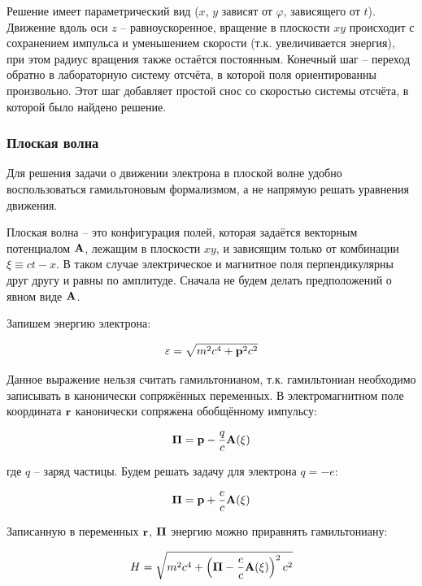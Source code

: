 \documentclass[10pt, a4paper]{article}
\begin{document}
Решение имеет параметрический вид ($x$, $y$ зависят от $\varphi$, зависящего от $t$). Движение вдоль оси $z$ -- равноускоренное, вращение в плоскости $xy$ происходит с сохранением импульса и уменьшением скорости (т.к. увеличивается энергия), при этом радиус вращения также остаётся постоянным. Конечный шаг -- переход обратно в лабораторную систему отсчёта, в которой поля ориентированны произвольно. Этот шаг добавляет простой снос со скоростью системы отсчёта, в которой было найдено решение.

\subsubsection{Плоская волна}

Для решения задачи о движении электрона в плоской волне удобно воспользоваться гамильтоновым формализмом, а не напрямую решать уравнения движения.

Плоская волна -- это конфигурация полей, которая задаётся векторным потенциалом $\vb{A}$, лежащим в плоскости $xy$, и зависящим только от комбинации $\xi\equiv ct - x$. В таком случае электрическое и магнитное поля перпендикулярны друг другу и равны по амплитуде. Сначала не будем делать предположений о явном виде $\vb{A}$.

Запишем энергию электрона:

\begin{equation*}
	\varepsilon = \sqrt{m^2c^4 + \vb{p}^2 c^2}
\end{equation*}

Данное выражение нельзя считать гамильтонианом, т.к. гамильтониан необходимо записывать в канонически сопряжённых переменных. В электромагнитном поле координата $\vb{r}$ канонически сопряжена обобщённому импульсу:

\begin{equation*}
	\vb{\Pi} = \vb{p} - \frac{q}{c}\vb{A}(\vb{\xi})
\end{equation*}

где $q$ -- заряд частицы. Будем решать задачу для электрона $q=-e$:

\begin{equation*}
	\vb{\Pi} = \vb{p} + \frac{e}{c}\vb{A}(\vb{\xi})
\end{equation*}

Записанную в переменных $\vb{r}$, $\vb{\Pi}$ энергию можно приравнять гамильтониану:

\begin{equation*}
	H = \sqrt{m^2c^4 + \left( \vb{\Pi} - \frac{e}{c}\vb{A}(\xi) \right)^2 c^2}
\end{equation*}
\end{document}
